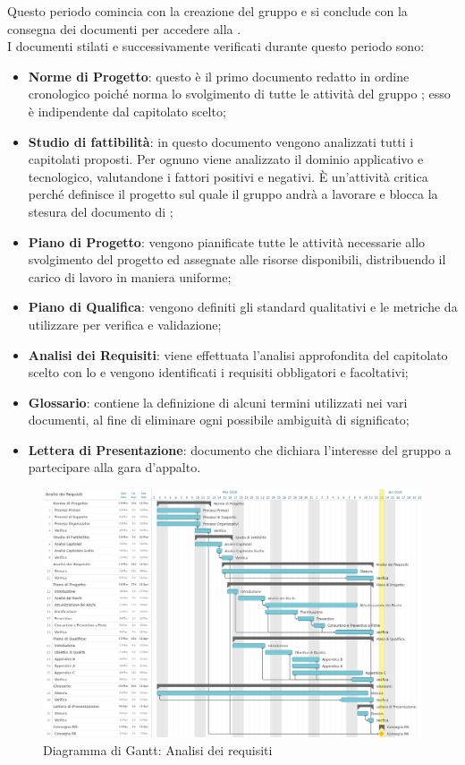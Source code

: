 Questo periodo comincia con la creazione del gruppo e si conclude con la consegna dei documenti per accedere alla \RR{}.\\
I documenti stilati e successivamente verificati durante questo periodo sono:
\begin{itemize}
\item \textbf{Norme di Progetto}: questo è il primo documento redatto in ordine cronologico poiché norma lo svolgimento di tutte le attività del gruppo \Gruppo{}; esso è indipendente dal capitolato scelto;
\item \textbf{Studio di fattibilità}: in questo documento vengono analizzati tutti i capitolati proposti. Per ognuno viene analizzato il dominio applicativo e tecnologico, valutandone i fattori positivi e negativi. È un’attività critica perché definisce il progetto sul quale il gruppo andrà a lavorare e blocca la stesura del documento di \AdR{};
\item \textbf{Piano di Progetto}: vengono pianificate tutte le attività necessarie allo svolgimento del progetto ed assegnate alle risorse disponibili, distribuendo il carico di lavoro in maniera uniforme;
\item \textbf{Piano di Qualifica}: vengono definiti gli standard qualitativi e le metriche da utilizzare per verifica e validazione;
\item \textbf{Analisi dei Requisiti}: viene effettuata l’analisi approfondita del capitolato scelto con lo \SdF{} e vengono identificati i requisiti obbligatori e facoltativi;
\item \textbf{Glossario}: contiene la definizione di alcuni termini utilizzati nei vari documenti, al fine di eliminare ogni possibile ambiguità di significato;
\item \textbf{Lettera di Presentazione}: documento che dichiara l’interesse del gruppo a partecipare alla gara d’appalto.
\end{itemize}

\begin{figure}[h!]
	\centerline{\includegraphics[scale=0.4]{img/DiagrammiGantt/AnalisiRequisiti.jpg}}
	\caption{Diagramma di Gantt: Analisi dei requisiti}
	\label{fig:gantt_ana_req}
\end{figure}
\clearpage

